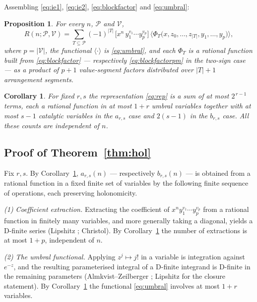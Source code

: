 \documentclass[11pt]{article}
\newtheorem{proposition}[theorem]{Proposition}
\newtheorem{corollary}[theorem]{Corollary}
\theoremstyle{definition}
\begin{document}
Assembling \eqref{eq:ie1}, \eqref{eq:ie2}, \eqref{eq:blockfactor} and
\eqref{eq:umbral}:

\begin{proposition}\label{prop:rep}
For every $n$, $\mathcal P$ and $\mathcal V$,
\begin{equation}\label{eq:rep}
  R(n;\mathcal P,\mathcal V)
  =\sum_{T\subseteq\mathcal P}(-1)^{|T|}\,
  \bigl[x^{n}\,y_1^{v_1}\cdots y_p^{v_p}\bigr]\,
  \bigl\langle\Phi_T\bigl(x,z_0,\dots,z_{|T|},y_1,\dots,y_p\bigr)\bigr\rangle,
\end{equation}
where $p=|\mathcal V|$, the functional $\langle\cdot\rangle$ is
\eqref{eq:umbral}, and each $\Phi_T$ is a rational function built from
\eqref{eq:blockfactor} --- respectively \eqref{eq:blockfactorpm} in the two-sign
case --- as a product of $p+1$ value-segment factors distributed over $|T|+1$
arrangement segments.
\end{proposition}

\begin{corollary}\label{cor:bounded}
For fixed $r,s$ the representation \eqref{eq:rep} is a sum of at most
$2^{\,r-1}$ terms, each a rational function in at most $1+r$ umbral variables
together with at most $s-1$ catalytic variables in the $a_{r,s}$ case and
$2(s-1)$ in the $b_{r,s}$ case. All these counts are independent of $n$.
\end{corollary}

\subsection{Proof of Theorem~\ref{thm:hol}}

Fix $r,s$. By Corollary~\ref{cor:bounded}, $a_{r,s}(n)$ --- respectively
$b_{r,s}(n)$ --- is obtained from a rational function in a fixed finite set of
variables by the following finite sequence of operations, each preserving
holonomicity.

\emph{(1) Coefficient extraction.} Extracting the coefficient of
$x^{n}y_1^{v_1}\cdots y_p^{v_p}$ from a rational function in finitely many
variables, and more generally taking a diagonal, yields a D-finite series
(Lipshitz \cite{LipshitzDiag}; Christol). By Corollary~\ref{cor:bounded} the
number of extractions is at most $1+p$, independent of $n$.

\emph{(2) The umbral functional.} Applying $z^{j}\mapsto j!$ in a variable is
integration against $e^{-z}$, and the resulting parameterised integral of a
D-finite integrand is D-finite in the remaining parameters
(Almkvist--Zeilberger \cite{AZ}; Lipshitz \cite{Lipshitz} for the closure
statement). By Corollary~\ref{cor:bounded} the functional \eqref{eq:umbral}
involves at most $1+r$ variables.
\end{document}
